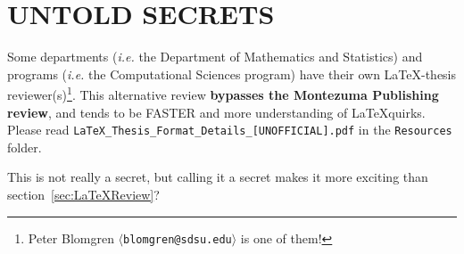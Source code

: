 \chapter*{UNTOLD SECRETS}

Some departments (\emph{i.e.}\/ the Department of Mathematics and
Statistics) and programs (\emph{i.e.}\/ the Computational Sciences
program) have their own \LaTeX-thesis reviewer(s)\footnote{Peter
  Blomgren \texttt{$\langle$blomgren@sdsu.edu$\rangle$} is one of
  them!}.  This alternative review \textbf{bypasses the Montezuma
  Publishing review}, and tends to be FASTER and more understanding of
\LaTeX quirks.  Please read
\texttt{LaTeX\_Thesis\_Format\_Details\_[UNOFFICIAL].pdf} in the
\texttt{Resources} folder.

This is not really a secret, but calling it a secret makes it more
exciting than section~\ref{sec:LaTeXReview}?

